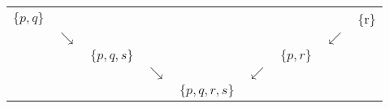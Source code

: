 \begin{tabular}{ccccccccc}
$\{p, q\}$ &            &               &            &                  &            &            &            & \{r\} \\
           & $\searrow$ &               &            &                  &            &            & $\swarrow$ &       \\
           &            & $\{p, q, s\}$ &            &                  &            & $\{p, r\}$ &            &       \\
           &            &               & $\searrow$ &                  & $\swarrow$ &            &            &       \\
           &            &               &            & $\{p, q, r, s\}$ &            &            &            &
\end{tabular}
